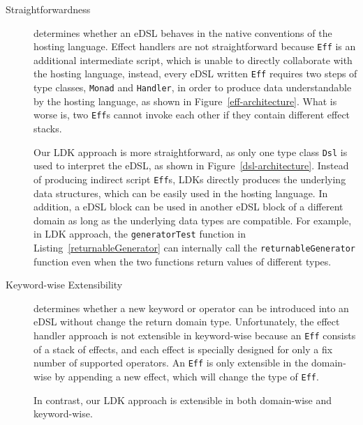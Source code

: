 \begin{description}
  \item[Straightforwardness] determines whether an eDSL behaves in the native conventions of the hosting language. Effect handlers are not straightforward because \lstinline{Eff} is an additional intermediate script, which is unable to directly collaborate with the hosting language, instead, every eDSL written \lstinline{Eff} requires two steps of type classes, \lstinline{Monad} and \lstinline{Handler}, in order to produce data understandable by the hosting language, as shown in Figure~\ref{eff-architecture}. What is worse is, two \lstinline{Eff}s cannot invoke each other if they contain different effect stacks.

  Our LDK approach is more straightforward, as only one type class \lstinline{Dsl} is used to interpret the eDSL, as shown in Figure~\ref{dsl-architecture}. Instead of producing indirect script \lstinline{Eff}s, LDKs directly produces the underlying data structures, which can be easily used in the hosting language. In addition, a eDSL block can be used in another eDSL block of a different domain as long as the underlying data types are compatible. For example, in LDK approach, the \lstinline{generatorTest} function in Listing~\ref{returnableGenerator} can internally call the \lstinline{returnableGenerator} function even when the two functions return values of different types.

  \item[Keyword-wise Extensibility] determines whether a new keyword or operator can be introduced into an eDSL without change the return domain type. Unfortunately, the effect handler approach is not extensible in keyword-wise because an \lstinline{Eff} consists of a stack of effects, and each effect is specially designed for only a fix number of supported operators. An \lstinline{Eff} is only extensible in the domain-wise by appending a new effect, which will change the type of \lstinline{Eff}. 

  In contrast, our LDK approach is extensible in both domain-wise and keyword-wise.

\end{description}

